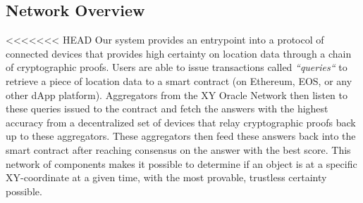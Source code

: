 \documentclass{article}
\begin{document}
\subsection {Network Overview}
<<<<<<< HEAD
Our system provides an entrypoint into a protocol of connected devices that provides high certainty on location data through a chain of cryptographic proofs. Users are able to issue transactions called \textit{``queries``} to retrieve a piece of location data to a smart contract (on Ethereum, EOS, or any other dApp platform). Aggregators from the XY Oracle Network then listen to these queries issued to the contract and fetch the answers with the highest accuracy from a decentralized set of devices that relay cryptographic proofs back up to these aggregators. These aggregators then feed these answers back into the smart contract after reaching consensus on the answer with the best score. This network of components makes it possible to determine if an object is at a specific XY-coordinate at a given time, with the most provable, trustless certainty possible.
\end{document}
